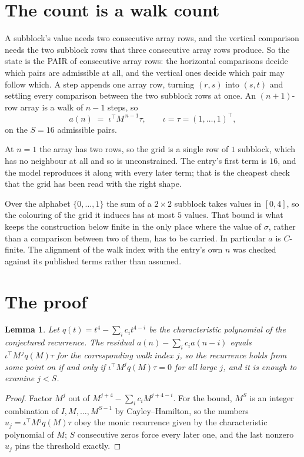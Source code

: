 \documentclass[11pt,a4paper]{article}
\theoremstyle{plain}
\newtheorem{lemma}[theorem]{Lemma}
\theoremstyle{definition}
\begin{document}
\section{The count is a walk count}

A subblock's value needs two consecutive array rows, and the vertical
comparison needs the two subblock rows that three consecutive array rows produce. So the state
is the PAIR of consecutive array rows: the horizontal comparisons decide which pairs are
admissible at all, and the vertical ones decide which pair may follow which. A step appends one
array row, turning $(r,s)$ into $(s,t)$ and settling every comparison between the two subblock
rows at once. An $(n+1)$-row array is a walk of $n-1$ steps, so
\[
a(n)\;=\;\iota^{\!\top}M^{\,n-1}\tau,\qquad\iota=\tau=(1,\dots,1)^{\!\top},
\]
on the $S=16$ admissible pairs.

At $n=1$ the array has two rows, so the grid is a single row of $1$
subblock, which has no neighbour at all and so is unconstrained. The
entry's first term is $16$, and the model reproduces it along with every later term; that
is the cheapest check that the grid has been read with the right shape.

Over the alphabet $\{0,\dots,1\}$ the sum of a $2\times2$ subblock takes values in
$[0,4]$, so the colouring of the grid it induces has at most $5$ values.
That bound is what keeps the construction below finite in the only place where the value of
$\sigma$, rather than a comparison between two of them, has to be carried.
In particular $a$ is $C$-finite. The alignment of the walk index with the entry's own $n$ was
checked against its published terms rather than assumed.

\section{The proof}

\begin{lemma}\label{lem:crit}
Let $q(t)=t^{4}-\sum_i c_it^{4-i}$ be the characteristic polynomial of the
conjectured recurrence. The residual $a(n)-\sum_ic_ia(n-i)$ equals
$\iota^{\!\top}M^{\,j}q(M)\tau$ for the corresponding walk index $j$, so the recurrence
holds from some point on if and only if $\iota^{\!\top}M^{j}q(M)\tau=0$ for all large $j$,
and it is enough to examine $j<S$.
\end{lemma}

\begin{proof}
Factor $M^{j}$ out of $M^{j+4}-\sum_ic_iM^{j+4-i}$. For the bound, $M^{S}$
is an integer combination of $I,M,\dots,M^{S-1}$ by Cayley--Hamilton, so the numbers
$u_j=\iota^{\!\top}M^{j}q(M)\tau$ obey the monic recurrence given by the characteristic
polynomial of $M$; $S$ consecutive zeros force every later one, and the last nonzero $u_j$
pins the threshold exactly.
\end{proof}
\end{document}
